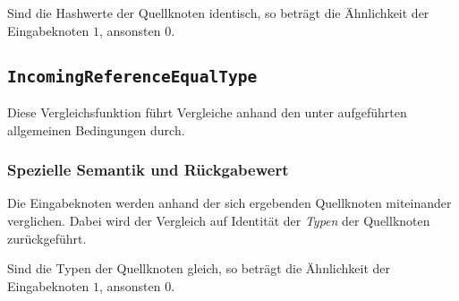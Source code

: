 Sind die Hashwerte der Quellknoten identisch, so beträgt die Ähnlichkeit der Eingabeknoten $1$, ansonsten $0$.


%
%
\subsection{\texttt{IncomingReferenceEqualType}}
Diese Vergleichsfunktion führt Vergleiche anhand den unter\mylinebreak{} aufgeführten allgemeinen Bedingungen durch.

\subsubsection*{Spezielle Semantik und Rückgabewert}
Die Eingabeknoten werden anhand der sich ergebenden Quellknoten miteinander verglichen. Dabei wird der Vergleich auf Identität der \emph{Typen} der Quellknoten zurückgeführt.

Sind die Typen der Quellknoten gleich, so beträgt die Ähnlichkeit der Eingabeknoten $1$, ansonsten $0$.